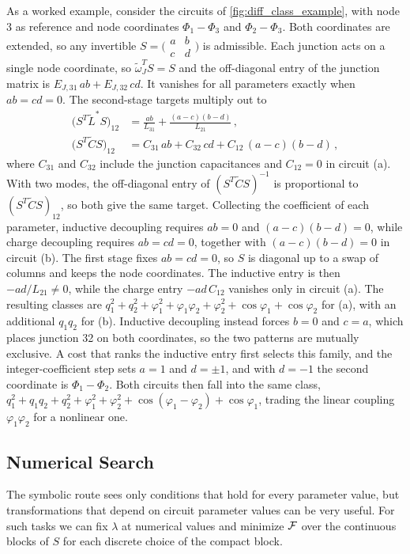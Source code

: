As a worked example, consider the circuits of \cref{fig:diff_class_example}, with node 3 as reference and node coordinates $\Phi_1-\Phi_3$ and $\Phi_2-\Phi_3$.
Both coordinates are extended, so any invertible $S=\bigl(\begin{smallmatrix}a&b\\c&d\end{smallmatrix}\bigr)$ is admissible.
Each junction acts on a single node coordinate, so $\tilde\omega_J^TS=S$ and the off-diagonal entry of the junction matrix is $E_{J,31}\,ab+E_{J,32}\,cd$.
It vanishes for all parameters exactly when $ab=cd=0$.
The second-stage targets multiply out to
\begin{align*}
    \bigl(S^T\tilde L^*S\bigr)_{12}&=\frac{ab}{L_{31}}+\frac{(a-c)(b-d)}{L_{21}} \, , \\
    \bigl(S^T\tilde CS\bigr)_{12}&=C_{31}\,ab+C_{32}\,cd+C_{12}\,(a-c)(b-d) \, ,
\end{align*}
where $C_{31}$ and $C_{32}$ include the junction capacitances and $C_{12}=0$ in circuit (a).
With two modes, the off-diagonal entry of $(S^T\tilde CS)^{-1}$ is proportional to $(S^T\tilde CS)_{12}$, so both give the same target.
Collecting the coefficient of each parameter, inductive decoupling requires $ab=0$ and $(a-c)(b-d)=0$, while charge decoupling requires $ab=cd=0$, together with $(a-c)(b-d)=0$ in circuit (b).
The first stage fixes $ab=cd=0$, so $S$ is diagonal up to a swap of columns and keeps the node coordinates.
The inductive entry is then $-ad/L_{21}\neq0$, while the charge entry $-ad\,C_{12}$ vanishes only in circuit (a).
The resulting classes are $q_1^2+q_2^2+\varphi_1^2+\varphi_1\varphi_2+\varphi_2^2+\cos\varphi_1+\cos\varphi_2$ for (a), with an additional $q_1q_2$ for (b).
Inductive decoupling instead forces $b=0$ and $c=a$, which places junction 32 on both coordinates, so the two patterns are mutually exclusive.
A cost that ranks the inductive entry first selects this family, and the integer-coefficient step sets $a=1$ and $d=\pm1$, and with $d=-1$ the second coordinate is $\Phi_1-\Phi_2$.
Both circuits then fall into the same class, $q_1^2+q_1q_2+q_2^2+\varphi_1^2+\varphi_2^2+\cos(\varphi_1-\varphi_2)+\cos\varphi_1$, trading the linear coupling $\varphi_1\varphi_2$ for a nonlinear one.

\subsection{Numerical Search}\label{sec:NumericalSearch}

The symbolic route sees only conditions that hold for every parameter value, but transformations that depend on circuit parameter values can be very useful.
For such tasks we can fix $\lambda$ at numerical values and minimize $\mathcal{F}$ over the continuous blocks of $S$ for each discrete choice of the compact block.

